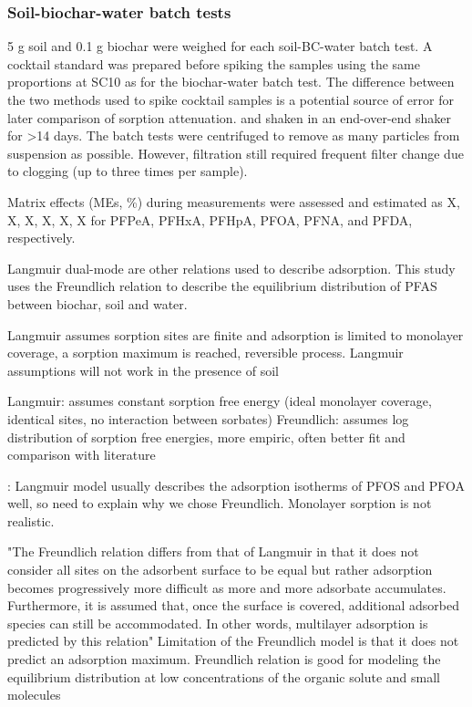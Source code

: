 \subsubsection{Soil-biochar-water batch tests}\label{sec:S-BC}
5 g soil and 0.1 g biochar were weighed for each soil-BC-water batch test. A cocktail standard was prepared before spiking the samples using the same proportions at SC10 as for the biochar-water batch test. The difference between the two methods used to spike cocktail samples is a potential source of error for later comparison of sorption attenuation. and shaken in an end-over-end shaker for \textgreater 14 days. The batch tests were centrifuged to remove as many particles from suspension as possible. However, filtration still required frequent filter change due to clogging (up to three times per sample).

Matrix effects (MEs, \%) during measurements were assessed and estimated as X, X, X, X, X, X for PFPeA, PFHxA, PFHpA, PFOA, PFNA, and PFDA, respectively.

Langmuir dual-mode are other relations used to describe adsorption. This study uses the Freundlich relation to describe the equilibrium distribution of PFAS between biochar, soil and water. 

Langmuir assumes sorption sites are finite and adsorption is limited to monolayer coverage, a sorption maximum is reached, reversible process. Langmuir assumptions will not work in the presence of soil

Langmuir: assumes constant sorption free energy (ideal monolayer coverage, identical sites, no interaction between sorbates)
Freundlich: assumes log distribution of sorption free energies, more empiric, often better fit and comparison with literature

\citep{du2014adsorption}: Langmuir model usually describes the adsorption isotherms of PFOS and PFOA well, so need to explain why we chose Freundlich. Monolayer sorption is not realistic. 

"The Freundlich relation differs from that of Langmuir in that it does not consider all sites on the adsorbent surface to be equal but rather adsorption becomes progressively more difficult as more and more adsorbate accumulates. Furthermore, it is assumed that, once the surface is covered, additional adsorbed species can still be accommodated. In other words, multilayer adsorption is predicted by this relation" \citep{vanloon2017Ch14}
Limitation of the Freundlich model is that it does not predict an adsorption maximum. 
Freundlich relation is good for modeling the equilibrium distribution at low concentrations of the organic solute and small molecules \citep{vanloon2017Ch14}